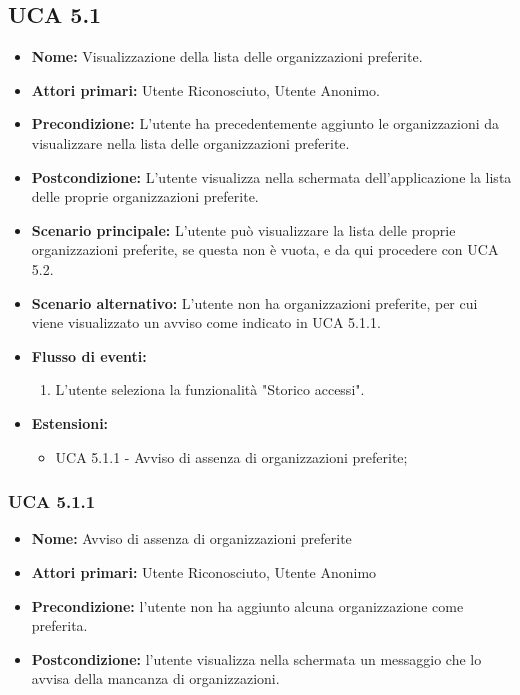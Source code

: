 \subsection{UCA 5.1}
\begin{itemize}
    \item \textbf{Nome:} Visualizzazione della lista delle organizzazioni preferite.
    \item \textbf{Attori primari:} Utente Riconosciuto, Utente Anonimo.
    \item \textbf{Precondizione:} L’utente ha precedentemente aggiunto le organizzazioni da visualizzare nella lista delle organizzazioni preferite.
    \item \textbf{Postcondizione:} L’utente visualizza nella schermata dell’applicazione la lista delle proprie organizzazioni preferite. 
    \item \textbf{Scenario principale:} L'utente può visualizzare la lista delle proprie organizzazioni preferite, se questa non è vuota, e da qui procedere con UCA 5.2.
    \item \textbf{Scenario alternativo:} L'utente non ha organizzazioni preferite, per cui viene visualizzato un avviso come indicato in UCA 5.1.1.
    \item \textbf{Flusso di eventi:}
    \begin{enumerate}
        \item L'utente seleziona la funzionalità "Storico accessi".
    \end{enumerate}
    \item \textbf{Estensioni:}
    \begin{itemize}
        \item UCA 5.1.1 - Avviso di assenza di organizzazioni preferite;
    \end{itemize}
\end{itemize}

\subsubsection{UCA 5.1.1}
\begin{itemize}
    \item \textbf{Nome:} Avviso di assenza di organizzazioni preferite
    \item \textbf{Attori primari:} Utente Riconosciuto, Utente Anonimo
    \item \textbf{Precondizione:} l'utente non ha aggiunto alcuna organizzazione come preferita.
    \item \textbf{Postcondizione:} l'utente visualizza nella schermata un messaggio che lo avvisa della mancanza di organizzazioni.
\end{itemize}

